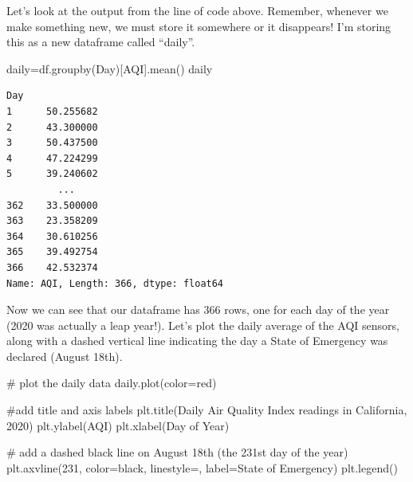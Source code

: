 \documentclass[
  letterpaper,
  DIV=11,
  numbers=noendperiod]{scrreprt}
\newenvironment{Shaded}{\begin{snugshade}}{\end{snugshade}}
\newcommand{\CommentTok}[1]{\textcolor[rgb]{0.37,0.37,0.37}{#1}}
\newcommand{\DecValTok}[1]{\textcolor[rgb]{0.68,0.00,0.00}{#1}}
\newcommand{\NormalTok}[1]{\textcolor[rgb]{0.00,0.23,0.31}{#1}}
\newcommand{\OperatorTok}[1]{\textcolor[rgb]{0.37,0.37,0.37}{#1}}
\newcommand{\StringTok}[1]{\textcolor[rgb]{0.13,0.47,0.30}{#1}}
\begin{document}
Let's look at the output from the line of code above. Remember, whenever
we make something new, we must store it somewhere or it disappears! I'm
storing this as a new dataframe called ``daily''.

\begin{Shaded}
\begin{Highlighting}[]
\NormalTok{daily}\OperatorTok{=}\NormalTok{df.groupby(}\StringTok{\textquotesingle{}Day\textquotesingle{}}\NormalTok{)[}\StringTok{\textquotesingle{}AQI\textquotesingle{}}\NormalTok{].mean()}
\NormalTok{daily}
\end{Highlighting}
\end{Shaded}

\begin{verbatim}
Day
1      50.255682
2      43.300000
3      50.437500
4      47.224299
5      39.240602
         ...    
362    33.500000
363    23.358209
364    30.610256
365    39.492754
366    42.532374
Name: AQI, Length: 366, dtype: float64
\end{verbatim}

Now we can see that our dataframe has 366 rows, one for each day of the
year (2020 was actually a leap year!). Let's plot the daily average of
the AQI sensors, along with a dashed vertical line indicating the day a
State of Emergency was declared (August 18th).

\begin{Shaded}
\begin{Highlighting}[]
\CommentTok{\# plot the daily data}
\NormalTok{daily.plot(color}\OperatorTok{=}\StringTok{\textquotesingle{}red\textquotesingle{}}\NormalTok{)}

\CommentTok{\#add title and axis labels}
\NormalTok{plt.title(}\StringTok{\textquotesingle{}Daily Air Quality Index readings in California, 2020\textquotesingle{}}\NormalTok{)}
\NormalTok{plt.ylabel(}\StringTok{\textquotesingle{}AQI\textquotesingle{}}\NormalTok{)}
\NormalTok{plt.xlabel(}\StringTok{\textquotesingle{}Day of Year\textquotesingle{}}\NormalTok{)}

\CommentTok{\# add a dashed black line on August 18th (the 231st day of the year)}
\NormalTok{plt.axvline(}\DecValTok{231}\NormalTok{, color}\OperatorTok{=}\StringTok{\textquotesingle{}black\textquotesingle{}}\NormalTok{, linestyle}\OperatorTok{=}\StringTok{\textquotesingle{}{-}{-}\textquotesingle{}}\NormalTok{, label}\OperatorTok{=}\StringTok{\textquotesingle{}State of Emergency\textquotesingle{}}\NormalTok{)}
\NormalTok{plt.legend()}
\end{Highlighting}
\end{Shaded}
\end{document}
